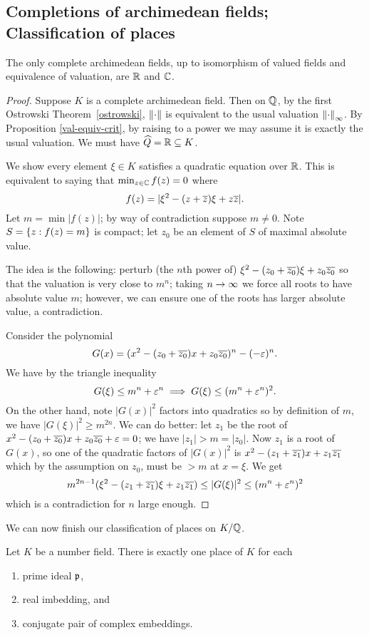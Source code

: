 \subsection{Completions of archimedean fields; Classification of places}
\begin{thm}[Ostrowski]
The only complete archimedean fields, up to isomorphism of valued fields and equivalence of valuation, are $\mathbb{R}$ and $\mathbb{C}$.
\end{thm}
\begin{proof}
Suppose $K$ is a complete archimedean field. Then on $\mathbb{Q}$, by the first Ostrowski Theorem~\ref{ostrowski}, $\left\Vert {\cdot}\right\Vert$ is equivalent to the usual valuation $\left\Vert {\cdot}\right\Vert_\infty$. By Proposition \ref{val-equiv-crit}, by raising to a power we may assume it is exactly the usual valuation. We must have $\widehat{Q}=\mathbb{R}\subseteq K$.

We show every element $\xi\in K$ satisfies a quadratic equation over $\mathbb{R}$. This is equivalent to saying that $\min_{z\in \mathbb{C}} f(z)=0$ where
\[
f(z)=|\xi^2-(z+\overline{z}) \xi +z \overline{z}|.
\]
Let $m=\min |f(z)|$; by way of contradiction suppose $m\ne 0$. Note $S=\left\{{z}:{f(z)=m}\right\}$ is compact; let $z_0$ be an element of $S$ of maximal absolute value. 

The idea is the following: perturb (the $n$th power of) $\xi^2-(z_0+\overline{z_0}) \xi +z_0 \overline{z_0}$ so that the valuation is very close to $m^n$; taking $n\to \infty$ we force all roots to have absolute value $m$; however, we can ensure one of the roots has larger absolute value, a contradiction.

Consider the polynomial
\[
G(x) = (x^2-(z_0+\overline{z_0})x+z_0\overline{z_0})^n -(-\varepsilon)^n.
\]
We have by the triangle inequality
\[
G(\xi) \le m^n +\varepsilon^n \implies G(\xi)\le (m^n+\varepsilon^n)^2.
\]
On the other hand, note $|G(x)|^2$ factors into quadratics so by definition of $m$, we have $|G(\xi)|^2\ge m^{2n}$. We can do better: let $z_1$ be the root of $x^2-(z_0+\overline{z_0})x+z_0\overline{z_0}+\varepsilon=0$; we have $|z_1|>m=|z_0|$.  Now $z_1$ is a root of $G(x)$, so one of the quadratic factors of $|G(x)|^2$ is $x^2-(z_1+\overline{z_1})x+z_1\overline{z_1}$ which by the assumption on $z_0$, must be $>m$ at $x=\xi$. We get 
\[
m^{2n-1}(\xi^2-(z_1+\overline{z_1})\xi+z_1\overline{z_1})
\le |G(\xi)|^2
\le (m^n+\varepsilon^n)^2
\]
which is a contradiction for $n$ large enough.
\end{proof}
We can now finish our classification of places on $K/\mathbb{Q}$.
\begin{thm}
Let $K$ be a number field. There is exactly one place of $K$ for each
\begin{enumerate}
\item
prime ideal $\mathfrak{p}$,
\item 
real imbedding, and
\item conjugate pair of complex embeddings.
\end{enumerate}
\end{thm}
